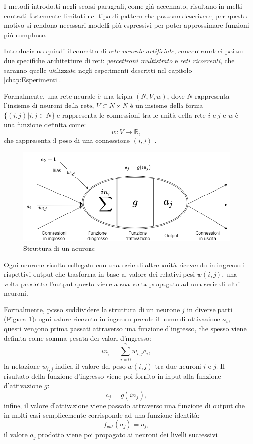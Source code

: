 \documentclass[../../main.tex]{subfiles}
\begin{document}
I metodi introdotti negli scorsi paragrafi, come già accennato, risultano in molti contesti fortemente limitati nel tipo di pattern che possono descrivere, per questo motivo si rendono necessari modelli più espressivi per poter approssimare funzioni più complesse.

Introduciamo quindi il concetto di \textit{rete neurale artificiale}, concentrandoci poi su due specifiche architetture di reti: \textit{percettroni multistrato} e \textit{reti ricorrenti}, che saranno quelle utilizzate negli esperimenti descritti nel capitolo \ref{chap:Esperimenti}.  

Formalmente, una rete neurale è una tripla $(N, V, w)$, dove $N$ rappresenta l'insieme di neuroni della rete, $V \subset N \times N$ è un insieme della forma $\{(i, j) | i,j \in N\}$ e rappresenta le connessioni tra le unità della rete $i$ e $j$ e $w$ è una funzione definita come:
\[w : V \rightarrow \mathbb{R},\]
che rappresenta il peso di una connessione $(i, j)$ \cite{kriesel2007bin}.

\begin{figure}[H]
    \centering
    \includegraphics[width=\textwidth]{immagini/4_2/neuron.png}
    \caption{Struttura di un neurone}
    \label{fig:neuron}
\end{figure}

Ogni neurone risulta collegato con una serie di altre unità ricevendo in ingresso i rispettivi output che trasforma in base al valore dei relativi pesi $w(i,j)$, una volta prodotto l'output questo viene a sua volta propagato ad una serie di altri neuroni.

Formalmente, posso suddividere la struttura di un neurone $j$ in diverse parti (Figura \ref{fig:neuron}): ogni valore ricevuto in ingresso prende il nome di attivazione $a_i$, questi vengono prima passati attraverso una funzione d'ingresso, che spesso viene definita come somma pesata dei valori d'ingresso:
\[in_j = \sum_{i=0}^n {w_{i,j} a_i},\]
la notazione $w_{i,j}$ indica il valore del peso $w(i,j)$ tra due neuroni $i$ e $j$. Il risultato della funzione d'ingresso viene poi fornito in input alla funzione d'attivazione $g$:
\[a_j = g(in_j),\]
infine, il valore d'attivazione viene passato attraverso una funzione di output che in molti casi semplicemente corrisponde ad una funzione identità:
\[f_{out}(a_j) = a_j,\]
il valore $a_j$ prodotto viene poi propagato ai neuroni dei livelli successivi.
\end{document}
